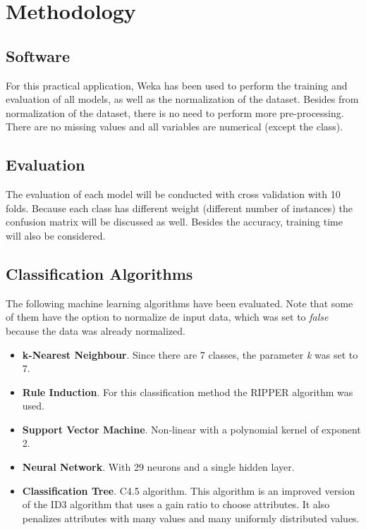 \documentclass[a4paper,11pt]{article}
\begin{document}
\section{Methodology}
\label{sec:methodology}

\subsection{Software}
\label{subsec:software}

For this practical application, Weka \cite{weka} has been used to perform the training and evaluation of all models, as well as the normalization of the dataset. Besides from normalization of the dataset, there is no need to perform more pre-processing. There are no missing values and all variables are numerical (except the class).

\subsection{Evaluation}
\label{subsec:evaluation}

The evaluation of each model will be conducted with cross validation with 10 folds. Because each class has different weight (different number of instances) the confusion matrix will be discussed as well. Besides the accuracy, training time will also be considered.

\subsection{Classification Algorithms}
\label{subsec:algorithms}

The following machine learning algorithms have been evaluated. Note that some of them have the option to normalize de input data, which was set to \textit{false} because the data was already normalized.

\begin{itemize}
\item \textbf{k-Nearest Neighbour}. Since there are 7 classes, the parameter \textit{k} was set to 7.
\item \textbf{Rule Induction}. For this classification method the RIPPER algorithm was used.
\item \textbf{Support Vector Machine}. Non-linear with a polynomial kernel of exponent 2.
\item \textbf{Neural Network}. With 29 neurons and a single hidden layer.
\item \textbf{Classification Tree}. C4.5 algorithm. This algorithm is an improved version of the ID3 algorithm that uses a gain ratio to choose attributes. It also penalizes attributes with many values and many uniformly distributed values.
\end{itemize}
\end{document}
